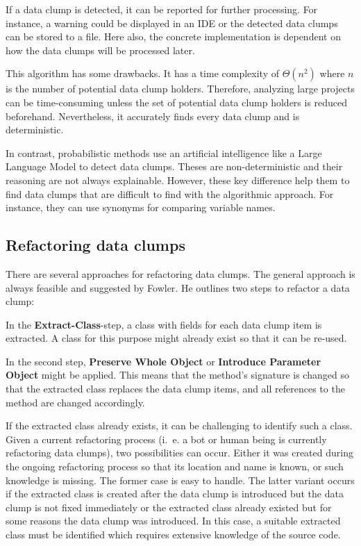 If a data clump is detected, it can be reported for further processing. For instance, a warning could be displayed in an \ac{IDE} or the detected data clumps can be stored to a file. Here also, the concrete implementation is dependent on how the data clumps will be processed later.

This algorithm has some drawbacks. It has a time complexity of $\Theta(n^2)$ where $n$ is the number of potential data clump holders. Therefore, analyzing  large projects can be time-consuming unless the set of potential data clump holders is reduced beforehand. Nevertheless, it accurately finds every data clump and is deterministic.

In contrast, probabilistic methods use an artificial intelligence like a Large Language Model to detect data clumps. Theses are non-deterministic and their reasoning are not always explainable. However,  these key difference help them to find data clumps that are difficult to find with the algorithmic approach. For instance, they can use synonyms for comparing variable names. 
  
\subsection{Refactoring data clumps}\label{sec:data_clump_refactor}

There are several approaches for refactoring data clumps. The general approach is always feasible and suggested by Fowler.
He outlines two  steps to refactor a data clump:

In the  \textbf{Extract-Class}-step, a class with fields for each data clump item is extracted. A class for this purpose might already exist so that it can be re-used.

In the second step, \textbf{Preserve Whole Object} or \textbf{Introduce Parameter Object} might be applied. This means that the method's signature is changed so that the extracted class replaces the data clump items, and all references to the method are changed accordingly.

If the extracted class already exists, it can be challenging to identify such a class. Given a current refactoring process (i.~e. a bot or human being is currently refactoring data clumps), two possibilities can occur. Either it was created during the ongoing refactoring process so that its location and name is known, or such knowledge is missing. The former case is easy to handle.  The latter variant occurs if the extracted class is created after the data clump is introduced but the data clump is not fixed immediately or the extracted class already existed but for some reasons the data clump was introduced. In this case, a suitable extracted class must be identified which requires extensive knowledge of the source code.


